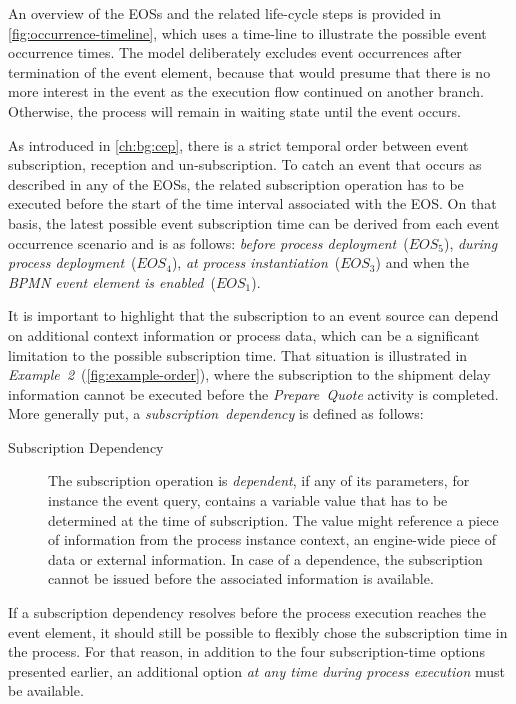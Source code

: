 An overview of the EOSs and the related life-cycle steps is provided in \autoref{fig:occurrence-timeline}, which uses a time-line to illustrate the possible event occurrence times.
The model deliberately excludes event occurrences after termination of the event element, because that would presume that there is no more interest in the event as the execution flow continued on another branch. Otherwise, the process will remain in waiting state until the event occurs.


As introduced in \autoref{ch:bg:cep}, there is a strict temporal order between event subscription, reception and un-subscription.
To catch an event that occurs as described in any of the EOSs, the related subscription operation has to be executed before the start of the time interval associated with the EOS.
On that basis, the latest possible event subscription time can be derived from each event occurrence scenario and is as follows:
\textit{before process deployment}~($EOS_{5}$), \textit{during process deployment}~($EOS_{4}$), \textit{at process instantiation}~($EOS_{3}$) and when the \textit{BPMN event element is enabled}~($EOS_{1}$).

It is important to highlight that the subscription to an event source can depend on additional context information or process data, which can be a significant limitation to the possible subscription time.
That situation is illustrated in \textit{Example~2}~(\autoref{fig:example-order}), where the subscription to the shipment delay information cannot be executed before the \textit{Prepare~Quote} activity is completed.
More generally put, a \textit{subscription~dependency} is defined as follows:

\begin{description}
	\item[Subscription Dependency]
	The subscription operation is \textit{dependent}, if any of its parameters, for instance the event query, contains a variable value that has to be determined at the time of subscription.
	The value might reference a piece of information from the process instance context, an engine-wide piece of data or external information.
	In case of a dependence, the subscription cannot be issued before the associated information is available.
\end{description}

If a subscription dependency resolves before the process execution reaches the event element, it should still be possible to flexibly chose the subscription time in the process.
For that reason, in addition to the four subscription-time options presented earlier, an additional option \textit{at any time during process execution} must be available.


